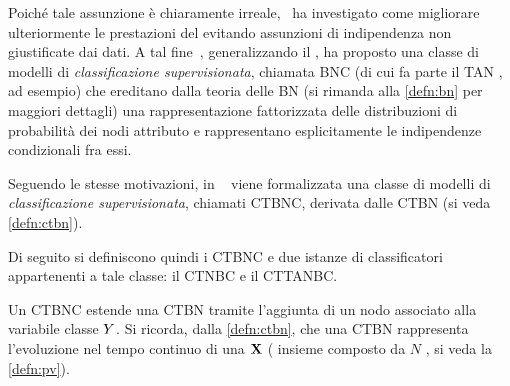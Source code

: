 Poiché tale assunzione è chiaramente irreale,~\citet{Friedman1997} ha investigato come migliorare ulteriormente le prestazioni del \lwcase \nb{} \class{} evitando assunzioni di indipendenza non giustificate dai dati. A tal fine~\citet{Friedman1997}, generalizzando il \lwcase \nb{} \class{}, ha proposto una classe di modelli di \emph{classificazione supervisionata}, chiamata \acf{BNC} (di cui fa parte il \acf{TAN} \class{}, ad esempio) che ereditano dalla teoria delle \acl{BN} (si rimanda alla \autoref{defn:bn} per maggiori dettagli) una rappresentazione fattorizzata delle distribuzioni di probabilità dei nodi attributo e rappresentano esplicitamente le indipendenze condizionali fra essi.

Seguendo le stesse motivazioni, in ~\citet{Stella2012} viene formalizzata una classe di modelli di \emph{classificazione supervisionata}, chiamati \acf{CTBNC}, derivata dalle \acs{CTBN} (si veda \autoref{defn:ctbn}).

Di seguito si definiscono quindi i \acl{CTBNC} e due istanze di classificatori appartenenti a tale classe: il \acf{CTNBC} e il \acf{CTTANBC}.

Un \acl{CTBNC} estende una \acs{CTBN} tramite l'aggiunta di un nodo associato alla variabile classe $\mathnormal{Y}$. Si ricorda, dalla \autoref{defn:ctbn}, che una \acs{CTBN} rappresenta l'evoluzione nel tempo continuo di una \pv{} $\mathbf{X}$ (\ie{} insieme composto da $N$ \mprocess{}, si veda la \autoref{defn:pv}).

